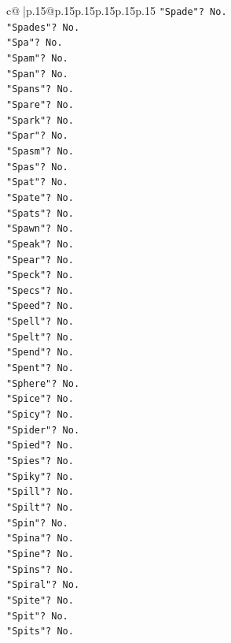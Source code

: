 \documentclass{article}
\begin{document}
{\begin{supertabular}{c@{$\;$}|p{.15\linewidth}@{}p{.15\linewidth}p{.15\linewidth}p{.15\linewidth}p{.15\linewidth}p{.15\linewidth}}
{{{\texttt{"Spade"? No.} \\
\texttt{"Spades"? No.} \\
\texttt{"Spa"? No.} \\
\texttt{"Spam"? No.} \\
\texttt{"Span"? No.} \\
\texttt{"Spans"? No.} \\
\texttt{"Spare"? No.} \\
\texttt{"Spark"? No.} \\
\texttt{"Spar"? No.} \\
\texttt{"Spasm"? No.} \\
\texttt{"Spas"? No.} \\
\texttt{"Spat"? No.} \\
\texttt{"Spate"? No.} \\
\texttt{"Spats"? No.} \\
\texttt{"Spawn"? No.} \\
\texttt{"Speak"? No.} \\
\texttt{"Spear"? No.} \\
\texttt{"Speck"? No.} \\
\texttt{"Specs"? No.} \\
\texttt{"Speed"? No.} \\
\texttt{"Spell"? No.} \\
\texttt{"Spelt"? No.} \\
\texttt{"Spend"? No.} \\
\texttt{"Spent"? No.} \\
\texttt{"Sphere"? No.} \\
\texttt{"Spice"? No.} \\
\texttt{"Spicy"? No.} \\
\texttt{"Spider"? No.} \\
\texttt{"Spied"? No.} \\
\texttt{"Spies"? No.} \\
\texttt{"Spiky"? No.} \\
\texttt{"Spill"? No.} \\
\texttt{"Spilt"? No.} \\
\texttt{"Spin"? No.} \\
\texttt{"Spina"? No.} \\
\texttt{"Spine"? No.} \\
\texttt{"Spins"? No.} \\
\texttt{"Spiral"? No.} \\
\texttt{"Spite"? No.} \\
\texttt{"Spit"? No.} \\
\texttt{"Spits"? No.} \\
}}}
\end{supertabular}}
\end{document}
